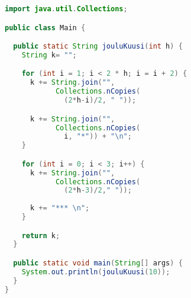 \headerfooteroff{}
\pagecolor{black!5}\afterpage{\nopagecolor}
\vspace*{\fill}
\begin{lstlisting}[language=Java]
import java.util.Collections;

public class Main {

  public static String jouluKuusi(int h) {
    String k= "";

    for (int i = 1; i < 2 * h; i = i + 2) {
      k += String.join("", 
            Collections.nCopies(
              (2*h-i)/2, " "));

      k += String.join("", 
            Collections.nCopies(
              i, "*")) + "\n";
    }

    for (int i = 0; i < 3; i++) {
      k += String.join("", 
            Collections.nCopies(
              (2*h-3)/2," "));
              
      k += "*** \n";
    }

    return k;
  }

  public static void main(String[] args) {
    System.out.println(jouluKuusi(10));
  }
}
\end{lstlisting}
\vspace*{\fill}
\clearpage
\headerfooteron{}
